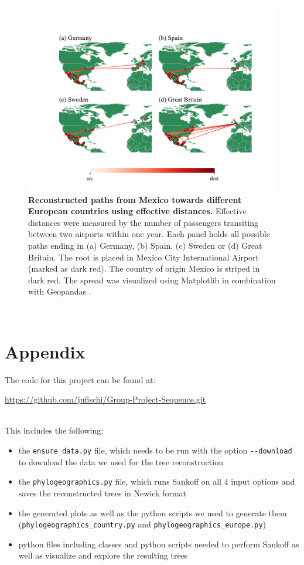 \documentclass{article}
\begin{document}
\begin{figure}[h!]
    \centering
    \includegraphics[width=\linewidth,trim={0.5cm 0 0.5cm 0}]{airport_effective_europe.pdf}
    \caption{\textbf{Reconstructed paths from Mexico towards different European countries using effective distances.} Effective distances were measured by the number of passengers transiting between two airports within one year. Each panel holds all possible paths ending in (a) Germany, (b) Spain, (c) Sweden or (d) Great Britain. The root is placed in Mexico City International Airport (marked as dark red). The country of origin Mexico is striped in dark red. The spread was visualized using Matplotlib \cite{MatplotlibVisualizationPython} in combination with Geopandas \cite{GeoPandas12GeoPandas}.}%
    \label{fig:Europe}
\end{figure}


  
 

\ \\
\appendix
\section*{Appendix}
The code for this project can be found at:

\url{https://github.com/jufischi/Group-Project-Sequence.git}

\ \\

This includes the following:
\begin{itemize}
    \item the \texttt{ensure\_data.py} file, which needs to be run with the option \texttt{-\texttt{-}download} to download the data we used for the tree reconstruction
    \item the \texttt{phylogeographics.py} file, which runs Sankoff on all 4 input options and saves the reconstructed trees in Newick format
    \item the generated plots as well as the python scripts we used to generate them (\texttt{phylogeographics\_country.py} and \texttt{phylogeographics\_europe.py})
    \item python files including classes and python scripts needed to perform Sankoff as well as visualize and explore the resulting trees
\end{itemize} 
\end{document}

